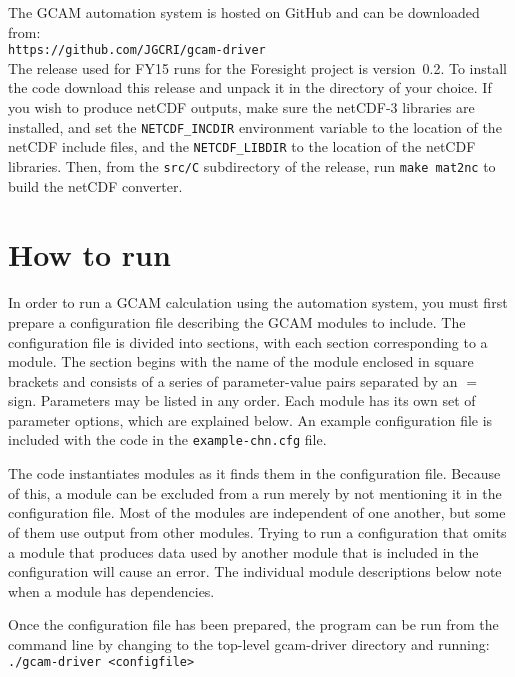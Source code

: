 \documentclass[11pt]{article}
\begin{document}
The GCAM automation system is hosted on GitHub and can be downloaded
from:\\
\texttt{https://github.com/JGCRI/gcam-driver}\\
The release used for FY15 runs for the Foresight project is
version~0.2.  To install the code download this release and unpack it
in the directory of your choice.  If you wish to produce netCDF
outputs, make sure the netCDF-3 libraries are installed, and set the
\texttt{NETCDF\_INCDIR} environment variable to the location of the
netCDF include files, and the \texttt{NETCDF\_LIBDIR} to the location
of the netCDF libraries.  Then, from the \texttt{src/C} subdirectory
of the release, run \texttt{make mat2nc} to build the netCDF
converter.

\section{How to run}

In order to run a GCAM calculation using the automation system, you
must first prepare a configuration file describing the GCAM modules to
include.  The configuration file is divided into sections, with each
section corresponding to a module.  The section begins with the name
of the module enclosed in square brackets and consists of a series of
parameter-value pairs separated by an $=$ sign.  Parameters may be
listed in any order.  Each module has its own set of parameter
options, which are explained below.  An example configuration file is
included with the code in the \texttt{example-chn.cfg} file.

The code instantiates modules as it finds them in the configuration
file.  Because of this, a module can be excluded from a run merely by
not mentioning it in the configuration file.  Most of the modules are
independent of one another, but some of them use output from other
modules.  Trying to run a configuration that omits a module that
produces data used by another module that is included in the
configuration will cause an error.  The individual module descriptions
below note when a module has dependencies.

Once the configuration file has been prepared, the program can be run
from the command line by changing to the 
top-level gcam-driver directory and running:\\
\texttt{./gcam-driver <configfile>}\\ 
\end{document}
